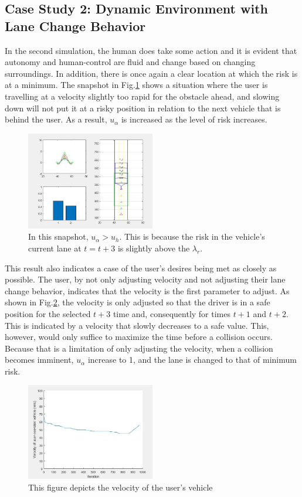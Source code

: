 \documentclass[conference]{IEEEtran}
\begin{document}
\subsection{Case Study 2: Dynamic Environment with Lane Change Behavior}
In the second simulation, the human does take some action and it is evident that autonomy and human-control are fluid and change based on changing surroundings. In addition, there is once again a clear location at which the risk is at a minimum. The snapshot in Fig.\ref{fig:cs2} shows a situation where the user is travelling at a velocity slightly too rapid for the obstacle ahead, and slowing down will not put it at a risky position in relation to the next vehicle that is behind the user. As a result, $u_{\alpha}$ is increased as the level of risk increases.
\begin{figure}[ht]
    \includegraphics[width=0.5\textwidth]{cs2.JPG}
    \caption{In this snapshot, $u_{\alpha} > u_{h}$. This is because the risk in the vehicle's current lane at $t = t+3$ is slightly above the $\lambda_{r}.$}
    \label{fig:cs2}
\end{figure}
This result also indicates a case of the user's desires being met as closely as possible. The user, by not only adjusting velocity and not adjusting their lane change behavior, indicates that the velocity is the first parameter to adjust. As shown in Fig.\ref{fig:cs2c}, the velocity is only adjusted so that the driver is in a safe position for the selected $t+3$ time and, consequently for times $t+1$ and $t+2$. This is indicated by a velocity that slowly decreases to a safe value. This, however, would only suffice to maximize the time before a collision occurs. Because that is a limitation of only adjusting the velocity, when a collision becomes imminent, $u_\alpha$ increase to 1, and the lane is changed to that of minimum risk.
\begin{figure}[ht]
    \includegraphics[width=0.5\textwidth]{cs2c.JPG}
    \caption{This figure depicts the velocity of the user's vehicle}
    \label{fig:cs2c}
\end{figure}
\end{document}
